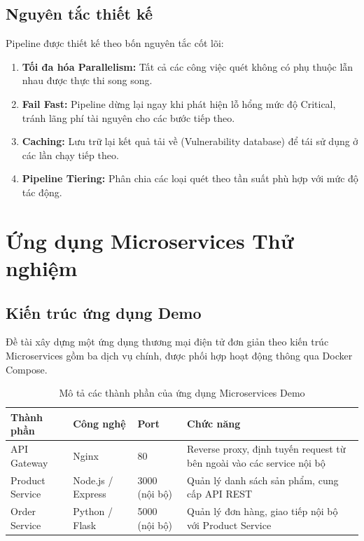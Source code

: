 \documentclass[12pt,a4paper]{report}
\begin{document}
\subsection{Nguyên tắc thiết kế}

Pipeline được thiết kế theo bốn nguyên tắc cốt lõi:
\begin{enumerate}[leftmargin=2cm]
    \item \textbf{Tối đa hóa Parallelism:} Tất cả các công việc quét không có phụ thuộc lẫn nhau được thực thi song song.
    \item \textbf{Fail Fast:} Pipeline dừng lại ngay khi phát hiện lỗ hổng mức độ Critical, tránh lãng phí tài nguyên cho các bước tiếp theo.
    \item \textbf{Caching:} Lưu trữ lại kết quả tải về (Vulnerability database) để tái sử dụng ở các lần chạy tiếp theo.
    \item \textbf{Pipeline Tiering:} Phân chia các loại quét theo tần suất phù hợp với mức độ tác động.
\end{enumerate}

\section{Ứng dụng Microservices Thử nghiệm}

\subsection{Kiến trúc ứng dụng Demo}

Đề tài xây dựng một ứng dụng thương mại điện tử đơn giản theo kiến trúc Microservices gồm ba dịch vụ chính, được phối hợp hoạt động thông qua Docker Compose.

\begin{table}[H]
\centering
\caption{Mô tả các thành phần của ứng dụng Microservices Demo}
\label{tab:services}
\begin{tabular}{|l|l|l|p{5cm}|}
\hline
\textbf{Thành phần} & \textbf{Công nghệ} & \textbf{Port} & \textbf{Chức năng} \\
\hline
API Gateway & Nginx & 80 & Reverse proxy, định tuyến request từ bên ngoài vào các service nội bộ \\
\hline
Product Service & Node.js / Express & 3000 (nội bộ) & Quản lý danh sách sản phẩm, cung cấp API REST \\
\hline
Order Service & Python / Flask & 5000 (nội bộ) & Quản lý đơn hàng, giao tiếp nội bộ với Product Service \\
\hline
\end{tabular}
\end{table}
\end{document}
